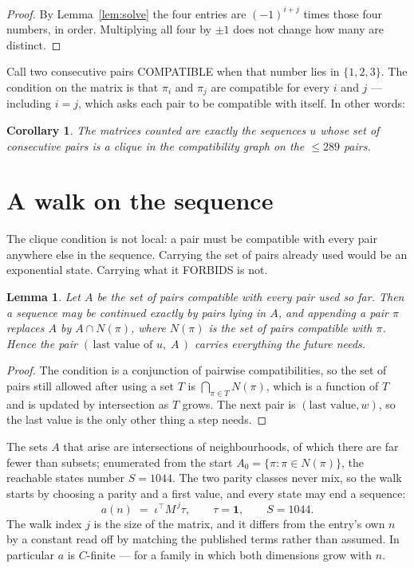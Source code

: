 \documentclass[11pt,a4paper]{article}
\theoremstyle{plain}
\newtheorem{lemma}[theorem]{Lemma}
\newtheorem{corollary}[theorem]{Corollary}
\theoremstyle{definition}
\begin{document}
\begin{proof}
By Lemma~\ref{lem:solve} the four entries are $(-1)^{i+j}$ times those four numbers, in
order. Multiplying all four by $\pm1$ does not change how many are distinct.
\end{proof}

Call two consecutive pairs COMPATIBLE when that number lies in $\{1,2,3\}$. The condition on the
matrix is that $\pi_i$ and $\pi_j$ are compatible for every $i$ and $j$ --- including $i=j$,
which asks each pair to be compatible with itself. In other words:

\begin{corollary}
The matrices counted are exactly the sequences $u$ whose set of consecutive pairs is a clique in
the compatibility graph on the $\le 289$ pairs.
\end{corollary}

\section{A walk on the sequence}

The clique condition is not local: a pair must be compatible with every pair anywhere else in
the sequence. Carrying the set of pairs already used would be an exponential state. Carrying
what it FORBIDS is not.

\begin{lemma}\label{lem:lump}
Let $A$ be the set of pairs compatible with every pair used so far. Then a sequence may be
continued exactly by pairs lying in $A$, and appending a pair $\pi$ replaces $A$ by
$A\cap N(\pi)$, where $N(\pi)$ is the set of pairs compatible with $\pi$. Hence the pair
$(\,\text{last value of }u,\;A\,)$ carries everything the future needs.
\end{lemma}

\begin{proof}
The condition is a conjunction of pairwise compatibilities, so the set of pairs still allowed
after using a set $T$ is $\bigcap_{\pi\in T}N(\pi)$, which is a function of $T$ and is updated
by intersection as $T$ grows. The next pair is $(\text{last value},w)$, so the last value is
the only other thing a step needs.
\end{proof}

The sets $A$ that arise are intersections of neighbourhoods, of which there are far fewer than
subsets; enumerated from the start $A_0=\{\pi:\pi\in N(\pi)\}$, the reachable states number
$S=1044$. The two parity classes never mix, so the walk starts by choosing a parity and a first
value, and every state may end a sequence:
\[
a(n)\;=\;\iota^{\!\top}M^{\,j}\tau ,\qquad \tau=\mathbf{1},\qquad S=1044.
\]
The walk index $j$ is the size of the matrix, and it differs from the entry's own $n$ by a
constant read off by matching the published terms rather than assumed. In particular $a$ is
$C$-finite --- for a family in which both dimensions grow with $n$.
\end{document}
